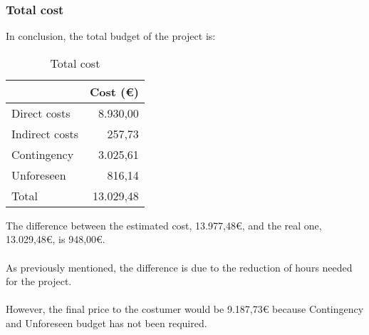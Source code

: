 \subsubsection{Total cost}
In conclusion, the total budget of the project is:
\begin{table}[h!]
	\centering
	\begin{tabular}{l|r|}
		\cline{2-2}
		& \multicolumn{1}{l|}{Cost (€)} \\ \hline
		\multicolumn{1}{|l|}{Direct costs} & 8.930,00 \\ \hline
		\multicolumn{1}{|l|}{Indirect costs}& 257,73\\ \hline
		\multicolumn{1}{|l|}{Contingency} & 3.025,61\\ \hline
		\multicolumn{1}{|l|}{Unforeseen} & 816,14\\ \hline\hline
		\multicolumn{1}{|l|}{Total} &  13.029,48\\ \hline
	\end{tabular}
	\caption{Total cost}
	\label{real-cost}
\end{table}
The difference between the estimated cost, 13.977,48€, and the real one, 13.029,48€, is 948,00€.\\\\
As previously mentioned, the difference is due to the reduction of hours needed for the project.\\\\
However, the final price to the costumer would be 9.187,73€ because Contingency and Unforeseen budget has not been required. 